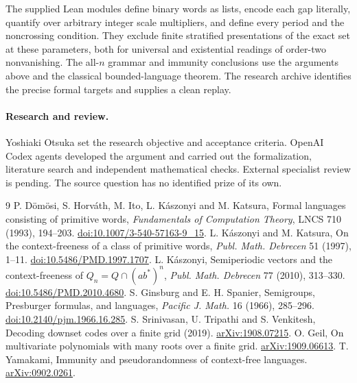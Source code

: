 \documentclass[11pt]{article}
\begin{document}
The supplied Lean modules define binary words as lists, encode each
gap literally, quantify over arbitrary integer scale multipliers, and
define every period and the noncrossing condition. They exclude finite
stratified presentations of the exact set at these parameters, both for
universal and existential readings of order-two nonvanishing. The
all-\(n\) grammar and immunity conclusions use the arguments above
and the classical bounded-language theorem. The research archive
identifies the precise formal targets and supplies a clean replay.

\paragraph{Research and review.}
Yoshiaki Otsuka set the research objective and acceptance criteria.
OpenAI Codex agents developed the argument and carried out the
formalization, literature search and independent mathematical checks.
External specialist review is pending. The source question has no
identified prize of its own.

\begin{thebibliography}{9}
P. D\"om\"osi, S. Horv\'ath, M. Ito, L. K\'aszonyi and M. Katsura,
Formal languages consisting of primitive words, \emph{Fundamentals
of Computation Theory}, LNCS 710 (1993), 194--203.
\href{https://doi.org/10.1007/3-540-57163-9_15}{doi:10.1007/3-540-57163-9\_15}.
L. K\'aszonyi and M. Katsura, On the context-freeness of a class of
primitive words, \emph{Publ. Math. Debrecen} 51 (1997), 1--11.
\href{https://doi.org/10.5486/PMD.1997.1707}{doi:10.5486/PMD.1997.1707}.
L. K\'aszonyi, Semiperiodic vectors and the context-freeness of
\(Q_n=Q\cap(ab^*)^n\), \emph{Publ. Math. Debrecen} 77 (2010), 313--330.
\href{https://doi.org/10.5486/PMD.2010.4680}{doi:10.5486/PMD.2010.4680}.
S. Ginsburg and E. H. Spanier, Semigroups, Presburger formulas, and
languages, \emph{Pacific J. Math.} 16 (1966), 285--296.
\href{https://doi.org/10.2140/pjm.1966.16.285}{doi:10.2140/pjm.1966.16.285}.
S. Srinivasan, U. Tripathi and S. Venkitesh, Decoding downset codes
over a finite grid (2019). \href{https://arxiv.org/abs/1908.07215}{arXiv:1908.07215}.
O. Geil, On multivariate polynomials with many roots over a finite
grid. \href{https://arxiv.org/abs/1909.06613}{arXiv:1909.06613}.
T. Yamakami, Immunity and pseudorandomness of context-free languages.
\href{https://arxiv.org/abs/0902.0261}{arXiv:0902.0261}.
\end{thebibliography}
\end{document}
